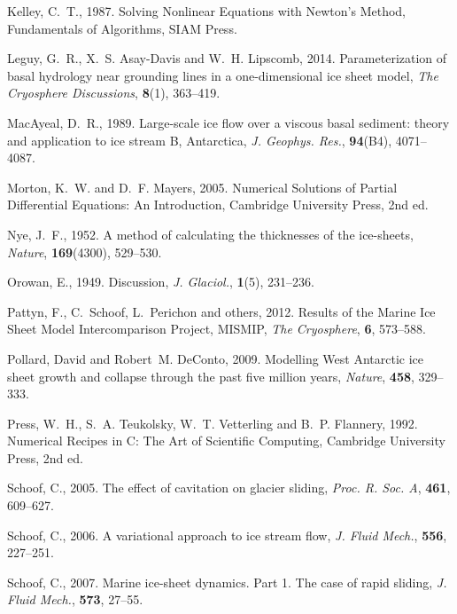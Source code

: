 \documentclass[twocolumn,letterpaper]{igs}
\begin{document}
\begin{thebibliography}{29}
Kelley, C.~T., 1987. Solving Nonlinear Equations with Newton's Method,
  Fundamentals of Algorithms, SIAM Press.

Leguy, G.~R., X.~S. Asay-Davis and W.~H. Lipscomb, 2014. Parameterization of
  basal hydrology near grounding lines in a one-dimensional ice sheet model,
  {\em The Cryosphere Discussions\/}, {\bf 8}(1), 363--419.

MacAyeal, D.~R., 1989. Large-scale ice flow over a viscous basal sediment:
  theory and application to ice stream {B}, {A}ntarctica, {\em J. Geophys.
  Res.\/}, {\bf 94}(B4), 4071--4087.

Morton, K.~W. and D.~F. Mayers, 2005. Numerical {S}olutions of {P}artial
  {D}ifferential {E}quations: {A}n {I}ntroduction, Cambridge University Press,
  2nd ed.

Nye, J.~F., 1952. A method of calculating the thicknesses of the ice-sheets,
  {\em Nature\/}, {\bf 169}(4300), 529--530.

Orowan, E., 1949. Discussion, {\em J. Glaciol.\/}, {\bf 1}(5), 231--236.

Pattyn, F., C.~Schoof, L.~Perichon and others, 2012. Results of the {M}arine
  {I}ce {S}heet {M}odel {I}ntercomparison {P}roject, {MISMIP}, {\em The
  Cryosphere\/}, {\bf 6}, 573--588.

Pollard, David and Robert~M. DeConto, 2009. Modelling {W}est {A}ntarctic ice
  sheet growth and collapse through the past five million years, {\em
  Nature\/}, {\bf 458}, 329--333.

Press, W.~H., S.~A. Teukolsky, W.~T. Vetterling and B.~P. Flannery, 1992.
  Numerical {R}ecipes in {C}: {T}he {A}rt of {S}cientific {C}omputing,
  Cambridge University Press, 2nd ed.

Schoof, C., 2005. The effect of cavitation on glacier sliding, {\em Proc. R.
  Soc. A\/}, {\bf 461}, 609--627.

Schoof, C., 2006. A variational approach to ice stream flow, {\em J. Fluid
  Mech.\/}, {\bf 556}, 227--251.

Schoof, C., 2007. Marine ice-sheet dynamics. {P}art 1. {T}he case of rapid
  sliding, {\em J. Fluid Mech.\/}, {\bf 573}, 27--55.


\end{thebibliography}
\end{document}

